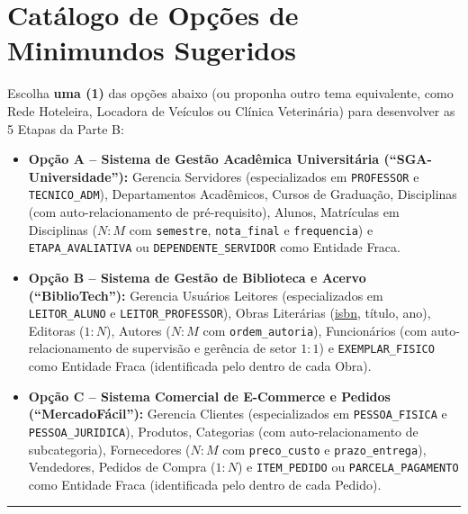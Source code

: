\documentclass[11pt,a4paper]{article}
\begin{document}
\section*{Catálogo de Opções de Minimundos Sugeridos}

Escolha \textbf{uma (1)} das opções abaixo (ou proponha outro tema equivalente, como Rede Hoteleira, Locadora de Veículos ou Clínica Veterinária) para desenvolver as 5 Etapas da Parte B:

\begin{itemize}[leftmargin=*, itemsep=2pt, topsep=2pt]
    \item \textbf{Opção A -- Sistema de Gestão Acadêmica Universitária (``SGA-Universidade''):}
    Gerencia Servidores (especializados em \texttt{PROFESSOR} e \texttt{TECNICO\_ADM}), Departamentos Acadêmicos, Cursos de Graduação, Disciplinas (com auto-relacionamento de pré-requisito), Alunos, Matrículas em Disciplinas ($N:M$ com \texttt{semestre}, \texttt{nota\_final} e \texttt{frequencia}) e \texttt{ETAPA\_AVALIATIVA} ou \texttt{DEPENDENTE\_SERVIDOR} como Entidade Fraca.
    \item \textbf{Opção B -- Sistema de Gestão de Biblioteca e Acervo (``BiblioTech''):}
    Gerencia Usuários Leitores (especializados em \texttt{LEITOR\_ALUNO} e \texttt{LEITOR\_PROFESSOR}), Obras Literárias (\underline{isbn}, título, ano), Editoras ($1:N$), Autores ($N:M$ com \texttt{ordem\_autoria}), Funcionários (com auto-relacionamento de supervisão e gerência de setor $1:1$) e \texttt{EXEMPLAR\_FISICO} como Entidade Fraca (identificada pelo  dentro de cada Obra).
    \item \textbf{Opção C -- Sistema Comercial de E-Commerce e Pedidos (``MercadoFácil''):}
    Gerencia Clientes (especializados em \texttt{PESSOA\_FISICA} e \texttt{PESSOA\_JURIDICA}), Produtos, Categorias (com auto-relacionamento de subcategoria), Fornecedores ($N:M$ com \texttt{preco\_custo} e \texttt{prazo\_entrega}), Vendedores, Pedidos de Compra ($1:N$) e \texttt{ITEM\_PEDIDO} ou \texttt{PARCELA\_PAGAMENTO} como Entidade Fraca (identificada pelo  dentro de cada Pedido).
\end{itemize}

\vspace{0.15cm}
\hrule
\vspace{0.2cm}

\end{document}
